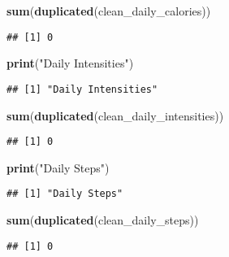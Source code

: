 \documentclass[
]{article}
\newenvironment{Shaded}{\begin{snugshade}}{\end{snugshade}}
\newcommand{\FunctionTok}[1]{\textcolor[rgb]{0.13,0.29,0.53}{\textbf{#1}}}
\newcommand{\NormalTok}[1]{#1}
\newcommand{\StringTok}[1]{\textcolor[rgb]{0.31,0.60,0.02}{#1}}
\begin{document}
\begin{Shaded}
\begin{Highlighting}[]
\FunctionTok{sum}\NormalTok{(}\FunctionTok{duplicated}\NormalTok{(clean\_daily\_calories))}
\end{Highlighting}
\end{Shaded}

\begin{verbatim}
## [1] 0
\end{verbatim}

\begin{Shaded}
\begin{Highlighting}[]
\FunctionTok{print}\NormalTok{(}\StringTok{"Daily Intensities"}\NormalTok{)}
\end{Highlighting}
\end{Shaded}

\begin{verbatim}
## [1] "Daily Intensities"
\end{verbatim}

\begin{Shaded}
\begin{Highlighting}[]
\FunctionTok{sum}\NormalTok{(}\FunctionTok{duplicated}\NormalTok{(clean\_daily\_intensities))}
\end{Highlighting}
\end{Shaded}

\begin{verbatim}
## [1] 0
\end{verbatim}

\begin{Shaded}
\begin{Highlighting}[]
\FunctionTok{print}\NormalTok{(}\StringTok{"Daily Steps"}\NormalTok{)}
\end{Highlighting}
\end{Shaded}

\begin{verbatim}
## [1] "Daily Steps"
\end{verbatim}

\begin{Shaded}
\begin{Highlighting}[]
\FunctionTok{sum}\NormalTok{(}\FunctionTok{duplicated}\NormalTok{(clean\_daily\_steps))}
\end{Highlighting}
\end{Shaded}

\begin{verbatim}
## [1] 0
\end{verbatim}
\end{document}
